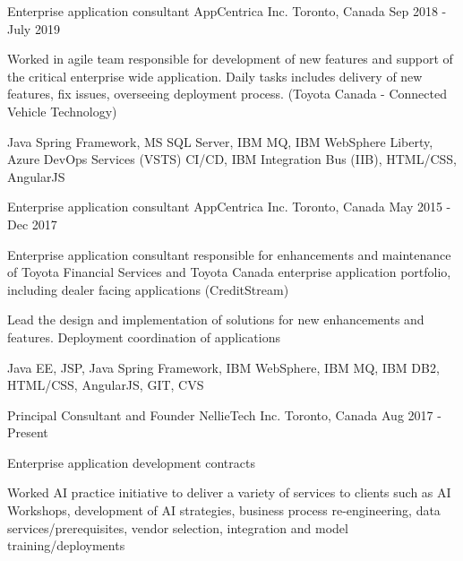 \begin{cventries}


  \cventry
    {Enterprise application consultant}
    {AppCentrica Inc.}
    {Toronto, Canada}
    {Sep 2018 - July 2019}
    {
      \begin{cvitems}
      	\item{Worked in agile team responsible for development of new features and support of the critical enterprise wide application. Daily tasks includes delivery of new features, fix issues, overseeing deployment process.  (Toyota Canada - Connected Vehicle Technology)}
       \item {Java Spring Framework, MS SQL Server, IBM MQ, IBM WebSphere Liberty, Azure DevOps Services (VSTS) CI/CD, IBM Integration Bus (IIB), HTML/CSS, AngularJS}
      \end{cvitems}
    }
    


  \cventry
    {Enterprise application consultant}
    {AppCentrica Inc.}
    {Toronto, Canada}
    {May 2015 - Dec 2017}
    {
      \begin{cvitems}
      	\item{Enterprise application consultant responsible for enhancements and maintenance of Toyota Financial Services and Toyota Canada enterprise application portfolio, including dealer facing applications (CreditStream)}
        \item {Lead the design and implementation of solutions for new enhancements and features. Deployment coordination of applications}
        \item {Java EE, JSP, Java Spring Framework, IBM WebSphere, IBM MQ, IBM DB2, HTML/CSS, AngularJS, GIT, CVS  }
      \end{cvitems}
    }

  \cventry
    {Principal Consultant and Founder}
    {NellieTech Inc.}
    {Toronto, Canada}
    {Aug 2017 - Present}
    {
      \begin{cvitems}
        \item{Enterprise application development contracts}
        \item{Worked AI practice initiative to deliver a variety of services to clients such as AI Workshops, development of AI strategies, business process re-engineering, data services/prerequisites, vendor selection, integration and model training/deployments}
      \end{cvitems}
    }
    

\end{cventries}
